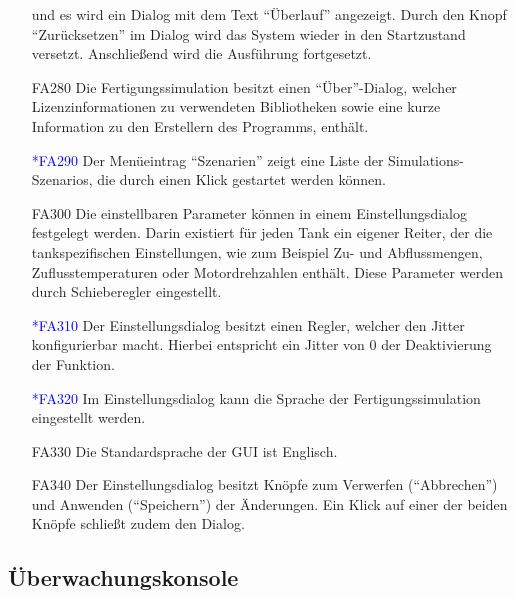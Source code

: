 \documentclass[parskip=full]{scrartcl}
\begin{document}
\begin{enumerate}
  und es wird ein Dialog mit dem Text "`\"Uberlauf"' angezeigt. Durch den Knopf "`Zur\"ucksetzen"' im Dialog wird das System wieder in den Startzustand versetzt.
  Anschlie{\ss}end wird die Ausführung fortgesetzt.
  \item[FA280] Die \gls{Fertigungssimulation} besitzt einen "`Über"'-Dialog, welcher Lizenzinformationen zu verwendeten Bibliotheken
    sowie eine kurze Information zu den Erstellern des Programms, enthält.
  \item[\textcolor{blue}{*FA290}] Der Menüeintrag "`Szenarien"' zeigt eine Liste der \glspl{Simulations-Szenario}, die durch einen Klick gestartet werden können.
  \item[FA300] Die einstellbaren Parameter können in einem Einstellungsdialog festgelegt werden. Darin existiert für jeden Tank ein eigener Reiter, der die
    tankspezifischen Einstellungen, wie zum Beispiel Zu- und Abflussmengen, Zuflusstemperaturen oder Motordrehzahlen enthält.
    Diese Parameter werden durch Schieberegler eingestellt.
  \item[\textcolor{blue}{*FA310}] Der Einstellungsdialog besitzt einen Regler, welcher den \gls{Jitter} konfigurierbar macht.
    Hierbei entspricht ein \gls{Jitter} von 0 der Deaktivierung der Funktion.
  \item[\textcolor{blue}{*FA320}] Im Einstellungsdialog kann die Sprache der \gls{Fertigungssimulation} eingestellt werden.
  \item[FA330] Die Standardsprache der \gls{GUI} ist Englisch.
  \item[FA340] Der Einstellungsdialog besitzt Knöpfe zum Verwerfen ("`Abbrechen"') und Anwenden ("`Speichern"') der Änderungen. Ein Klick auf einer der beiden Knöpfe schließt zudem den Dialog.
\end{enumerate}

\subsection{Überwachungskonsole}
\end{document}
